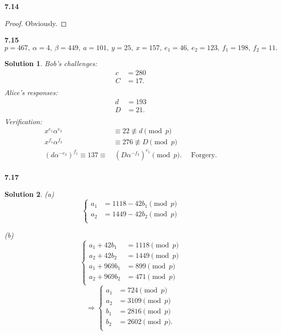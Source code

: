 \documentclass[12pt,a4paper]{article}
\newcommand{\lra}{\Longrightarrow}
\theoremstyle{solution}
\newtheorem*{sol}{Solution}
\begin{document}
\textbf{7.14}

\begin{proof}
Obviously.
\end{proof}

\textbf{7.15}
$p=467,~\alpha=4,~\beta=449,~a=101,~y=25,~x=157,~e_1=46,~e_2=123,~f_1=198,~f_2=11.$

\begin{sol}

Bob's challenges:
\begin{align*}
c&=280 \\
C&=17. \\
\end{align*}
Alice's responses:
\begin{align*}
d&=193 \\
D&=21. \\
\end{align*}
Verification:
\begin{align*}
x^{e_1} \alpha^{e_2}&\equiv 22 \nequiv d \pmod{p}\\
x^{f_1} \alpha^{f_2}&\equiv 276 \nequiv D \pmod{p}\\
(d\alpha^{-e_2})^{f_1} \equiv 137 \equiv & ~(D\alpha^{-f_2})^{e_1} \pmod{p}.\text{~~~~Forgery.}\\
\end{align*}
\end{sol}

\textbf{7.17}

\begin{sol}
(a)
\begin{equation*}
\left\{ \begin{aligned}
          a_1&=1118-42b_1 \pmod{p}\\
          a_2&=1449-42b_2 \pmod{p}\\
          \end{aligned} \right.
\end{equation*}

(b)
\begin{equation*}
\left\{ \begin{aligned}
          a_1+42b_1&=1118 \pmod{p}\\
          a_2+42b_2&=1449 \pmod{p}\\
          a_1+969b_1&=899 \pmod{p}\\
          a_2+969b_2&=471 \pmod{p}\\
          \end{aligned} \right.
\end{equation*}
\begin{equation*}
\lra \left\{ \begin{aligned}
          a_1&=724 \pmod{p}\\
          a_2&=3109 \pmod{p}\\
          b_1&=2816 \pmod{p}\\
          b_2&=2602 \pmod{p}.\\
          \end{aligned} \right.
\end{equation*}
\end{sol}
\end{document}
